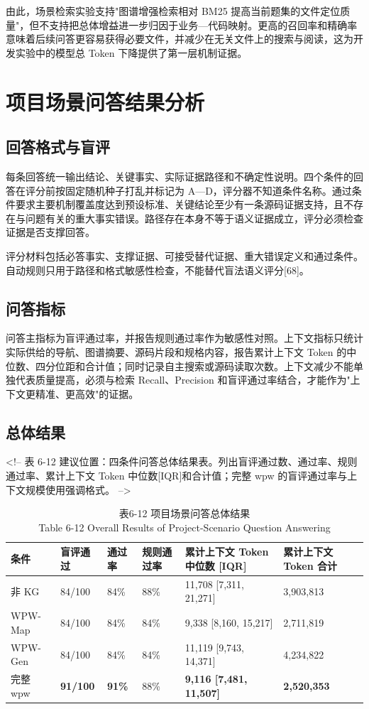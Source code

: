 由此，场景检索实验支持"图谱增强检索相对 BM25 提高当前题集的文件定位质量"，但不支持把总体增益进一步归因于业务—代码映射。更高的召回率和精确率意味着后续问答更容易获得必要文件，并减少在无关文件上的搜索与阅读，这为开发实验中的模型总 Token 下降提供了第一层机制证据。


\section{项目场景问答结果分析}

\subsection{回答格式与盲评}
每条回答统一输出结论、关键事实、实际证据路径和不确定性说明。四个条件的回答在评分前按固定随机种子打乱并标记为 A—D，评分器不知道条件名称。通过条件要求主要机制覆盖度达到预设标准、关键结论至少有一条源码证据支持，且不存在与问题有关的重大事实错误。路径存在本身不等于语义证据成立，评分必须检查证据是否支撑回答。

评分材料包括必答事实、支撑证据、可接受替代证据、重大错误定义和通过条件。自动规则只用于路径和格式敏感性检查，不能替代盲法语义评分[68]。


\subsection{问答指标}
问答主指标为盲评通过率，并报告规则通过率作为敏感性对照。上下文指标只统计实际供给的导航、图谱摘要、源码片段和规格内容，报告累计上下文 Token 的中位数、四分位距和合计值；同时记录自主搜索或源码读取次数。上下文减少不能单独代表质量提高，必须与检索 Recall、Precision 和盲评通过率结合，才能作为"上下文更精准、更高效"的证据。


\subsection{总体结果}
<!-- 表 6-12 建议位置：四条件问答总体结果表。列出盲评通过数、通过率、规则通过率、累计上下文 Token 中位数[IQR]和合计值；完整 wpw 的盲评通过率与上下文规模使用强调格式。 -->

\begin{table}[htbp]
\centering
\small
\caption{表6-12 项目场景问答总体结果\\Table 6-12 Overall Results of Project-Scenario Question Answering}
\begin{tabularx}{\textwidth}{|X|X|X|X|X|X|}
\hline
\textbf{条件} & \textbf{盲评通过} & \textbf{通过率} & \textbf{规则通过率} & \textbf{累计上下文 Token 中位数 [IQR]} & \textbf{累计上下文 Token 合计} \\
\hline
非 KG & 84/100 & 84\% & 88\% & 11,708 [7,311, 21,271] & 3,903,813 \\
WPW-Map & 84/100 & 84\% & 84\% & 9,338 [8,160, 15,217] & 2,711,819 \\
WPW-Gen & 84/100 & 84\% & 84\% & 11,119 [9,743, 14,371] & 4,234,822 \\
完整 wpw & \textbf{91/100} & \textbf{91\%} & 88\% & \textbf{9,116 [7,481, 11,507]} & \textbf{2,520,353} \\
\hline
\end{tabularx}
\end{table}

